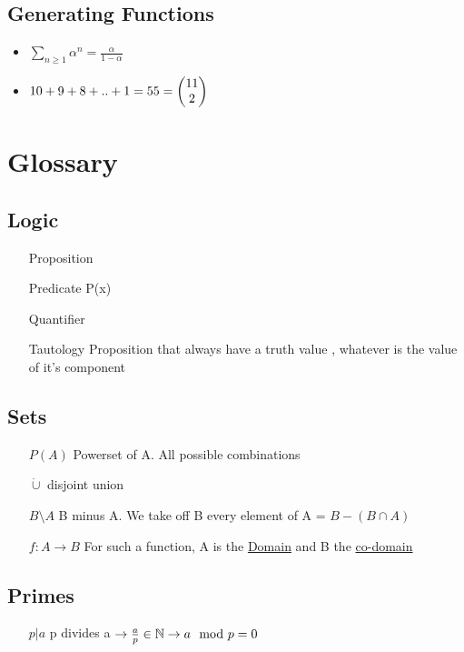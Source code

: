 \documentclass[12pt,a4paper]{article}
\begin{document}
\subsection{Generating Functions}
\begin{itemize}
	\item $\sum\limits_{n\geq 1} \alpha^n = \frac{\alpha}{1-\alpha}$
	\item $10+9+8+..+1 = 55  = \begin{pmatrix} 11 \\ 2 \end{pmatrix}$
\end{itemize}
\section{Glossary}
\subsection{Logic}
\begin{enumerate}
\item[Proposition]
\item[Predicate] P(x)
\item[Quantifier]
\item[Tautology] Proposition that always have a truth value , whatever is the value of it's component
\end{enumerate}
\subsection{Sets}
\begin{itemize}
\item[$P(A)$] Powerset of A. All possible combinations
\item [$\dot{\cup}$] disjoint union
\item [$B \setminus A$] B minus A. We take off B every element of A = $B - (B \cap A)$
\item [$f : A \rightarrow B$] For such a function, A is the \underline{Domain} and B the \underline{co-domain}
\end{itemize}
\subsection{Primes}
\begin{itemize}
\item[$p|a$] p divides a $\to \frac{a}{p} \in \mathbb{N} \to a \mod p = 0$
\end{itemize}
\end{document}
